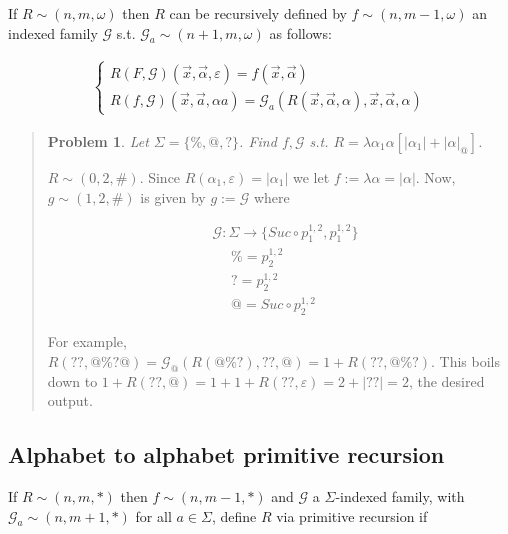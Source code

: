 \documentclass[a4paper, 12pt]{article}
\newtheorem{problem}{Problem}
\newtheorem{problem}{Problem}
\begin{document}
If $R \sim (n, m, \omega)$ then $R$ can be recursively defined by $f \sim (n, m
- 1, \omega)$ an indexed
family $\mathcal{G}$ s.t. $\mathcal{G}_a \sim (n + 1, m, \omega)$ as follows: 

\begin{align*}
    \begin{cases}
        R(F, \mathcal{G})(\overrightarrow{x}, \overrightarrow{\alpha}, \varepsilon)
        = f(\overrightarrow{x}, \overrightarrow{\alpha}) \\ 
        R(f, \mathcal{G})(\overrightarrow{x}, \overrightarrow{a}, \alpha a) =
        \mathcal{G}_a \left( R(\overrightarrow{x}, \overrightarrow{\alpha},
        \alpha), \overrightarrow{x}, \overrightarrow{\alpha}, \alpha \right) 
    \end{cases}
\end{align*}


\small
\begin{quote}


\begin{problem}
    Let $\Sigma = \{\%, @, ?\}$. Find $f, \mathcal{G}$ s.t. $R = \lambda \alpha_1
    \alpha \left[ |\alpha_1| + |\alpha|_{@} \right] $.
\end{problem}

$R \sim (0, 2, \#)$. Since $R(\alpha_1, \varepsilon) = | \alpha_1|$ we let $f :=
\lambda \alpha = |\alpha|$. Now, $g \sim (1, 2, \#)$ is given by $g :=
\mathcal{G}$ where 

\begin{align*}
    &\mathcal{G} : \Sigma \to \{ Suc \circ p_1^{1, 2}, p_1^{1, 2}  \} \\ 
    &~ ~ ~ ~ ~ ~  \% = p_{2}^{1, 2}\\
    &~ ~ ~ ~ ~ ~  ? = p_{2}^{1, 2}\\
    &~ ~ ~ ~ ~ ~  @ = Suc \circ p_{2}^{1, 2}
\end{align*}

For example, $R(??, @\%?@) = \mathcal{G}_{@} \left( R(@\%?), ??, @ \right) = 1 +
R(??, @\%?) $. This boils down to $1 + R(??, @) = 1 + 1 + R(??, \varepsilon) = 2 +
|??| = 2$, the desired output.

\end{quote}
\normalsize


\subsection{Alphabet to alphabet primitive recursion}

If $R \sim (n, m, *)$ then $f \sim (n, m-1, *)$ and $\mathcal{G}$ a $\Sigma$-indexed
family, with $\mathcal{G}_a \sim (n, m+1, *)$ for all $a\in \Sigma$, define $R$
via primitive recursion if 
\end{document}
